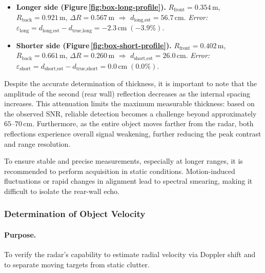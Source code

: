 \begin{itemize}
    \item \textbf{Longer side (Figure\,\ref{fig:box-long-profile}).}  
          \(R_{\text{front}} = 0.354\,\text{m}\), \(R_{\text{back}} = 0.921\,\text{m}\),   
          \(\Delta R = 0.567\,\text{m}\) \(\Rightarrow\)
          \(d_{\text{long,est}} = 56.7\,\text{cm}\).  
          \textit{Error:} \(\varepsilon_{\text{long}} = d_{\text{long,est}} - d_{\text{true,long}}
          = -2.3\,\text{cm}\;(-3.9\%)\).

    \item \textbf{Shorter side (Figure\,\ref{fig:box-short-profile}).}  
          \(R_{\text{front}} = 0.402\,\text{m}\), \(R_{\text{back}} = 0.661\,\text{m}\),   
          \(\Delta R = 0.260\,\text{m}\) \(\Rightarrow\)
          \(d_{\text{short,est}} = 26.0\,\text{cm}\).  
          \textit{Error:} \(\varepsilon_{\text{short}} = d_{\text{short,est}} - d_{\text{true,short}}
          = 0.0\,\text{cm}\;(0.0\%)\).
\end{itemize}

Despite the accurate determination of thickness, it is important to note that the amplitude of the second (rear wall) reflection decreases as the internal spacing increases. This attenuation limits the maximum measurable thickness: based on the observed SNR, reliable detection becomes a challenge beyond approximately \(65\text{–}70\,\text{cm}\). Furthermore, as the entire object moves farther from the radar, both reflections experience overall signal weakening, further reducing the peak contrast and range resolution.

To ensure stable and precise measurements, especially at longer ranges, it is recommended to perform acquisition in static conditions. Motion-induced fluctuations or rapid changes in alignment lead to spectral smearing, making it difficult to isolate the rear-wall echo.


\subsubsection{Determination of Object Velocity}\label{sec:velocity_test}

\paragraph{Purpose.}
To verify the radar’s capability to estimate radial velocity via Doppler shift and to separate moving targets from static clutter.

